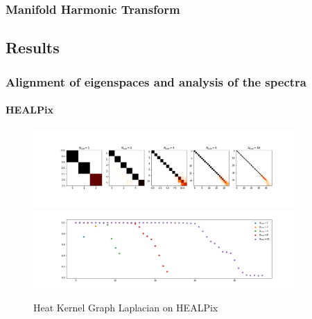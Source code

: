 \subsubsection{Manifold Harmonic Transform}



\subsection{Results}
\label{sec:Chapter3: Results}

\subsubsection{Alignment of eigenspaces and analysis of the spectra}

\paragraph{HEALPix}
\begin{figure}[h]
	\label{fig:HeatKernelGraphLaplacianHealpix}
	\centering
	\includegraphics[width=0.9\textwidth]{../codes/02.HeatKernelGraphLaplacian/HEALPix/06_figures/optimal_thresholded.png}
	\includegraphics[width=0.9\textwidth]{../codes/02.HeatKernelGraphLaplacian/HEALPix/06_figures/optimal_thresholded_diagonal.png}	
	\caption{Heat Kernel Graph Laplacian on HEALPix}
\end{figure}

